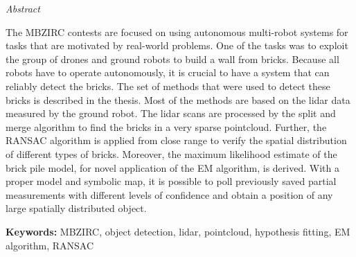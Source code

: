 \vfill
\begin{center}
{\it \large Abstract}
\vspace{0.2cm}

\begin{minipage}{0.8\textwidth}{
The MBZIRC contests are focused on using autonomous multi-robot systems for tasks that are motivated by real-world problems. One of the tasks was to exploit the group of drones and ground robots to build a wall from bricks. Because all robots have to operate autonomously, it is crucial to have a system that can reliably detect the bricks. The set of methods that were used to detect these bricks is described in the thesis. Most of the methods are based on the lidar data measured by the ground robot. The lidar scans are processed by the split and merge algorithm to find the bricks in a very sparse pointcloud. Further, the RANSAC algorithm is applied from close range to verify the spatial distribution of different types of bricks. Moreover, the maximum likelihood estimate of the brick pile model, for novel application of the EM algorithm, is derived. With a proper model and symbolic map, it is possible to poll previously saved partial measurements with different levels of confidence and obtain a position of any large spatially distributed object.
\vspace{3mm}
\par \textbf{Keywords:} MBZIRC, object detection, lidar, pointcloud, hypothesis fitting, EM algorithm, RANSAC
}
\end{minipage}
\end{center}
\vfill
\vspace{1cm}

